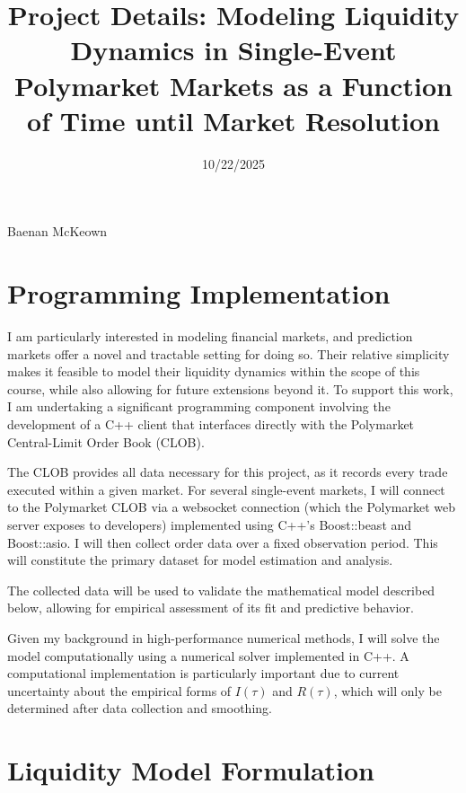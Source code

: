 \documentclass{article}
\begin{document}
\title{Project Details: Modeling Liquidity Dynamics in Single-Event Polymarket Markets as a Function of Time until Market Resolution}
\date{10/22/2025}
\maketitle
\thispagestyle{empty}
\vspace*{2cm}
\begin{center}
\Large Baenan McKeown
\end{center}
\newpage

\section*{Programming Implementation}

I am particularly interested in modeling financial markets, and prediction markets offer a novel and tractable setting for doing so. Their relative simplicity makes it feasible to model their liquidity dynamics within the scope of this course, while also allowing for future extensions beyond it. To support this work, I am undertaking a significant programming component involving the development of a C++ client that interfaces directly with the Polymarket Central-Limit Order Book (CLOB).

The CLOB provides all data necessary for this project, as it records every trade executed within a given market. For several single-event markets, I will connect to the Polymarket CLOB via a websocket connection (which the Polymarket web server exposes to developers) implemented using C++'s Boost::beast and Boost::asio. I will then collect order data over a fixed observation period. This will constitute the primary dataset for model estimation and analysis.

The collected data will be used to validate the mathematical model described below, allowing for empirical assessment of its fit and predictive behavior.

Given my background in high-performance numerical methods, I will solve the model computationally using a numerical solver implemented in C++. A computational implementation is particularly important due to current uncertainty about the empirical forms of \(I(\tau)\) and \(R(\tau)\), which will only be determined after data collection and smoothing.

\section*{Liquidity Model Formulation}
\end{document}
